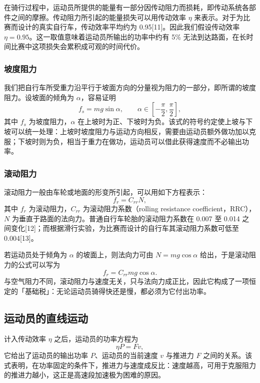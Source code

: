 \documentclass[11pt,a4paper]{ctexart}
\begin{document}
在骑行过程中，运动员所提供的能量有一部分因传动阻力而损耗，即传动系统各部件之间的摩擦。传动阻力所引起的能量损失可以用传动效率 $\eta$ 来表示。对于为比赛而设计的真实自行车，传动效率平均约为 0.95[11]。因此我们假设传动效率 $\eta=0.95$。这一取值意味着运动员所输出的功率中约有 5\% 无法到达路面，在长时间比赛中这项损失会累积成可观的时间代价。

\subsubsection{坡度阻力}

我们把自行车所受重力沿平行于坡面方向的分量视为阻力的一部分，即所谓的坡度阻力。设坡面的倾角为 $\alpha$，容易证明
\begin{equation}
f_s=mg\sin\alpha,\qquad \alpha\in\left[-\frac{\pi}{2},\frac{\pi}{2}\right],
\end{equation}
其中 $f_s$ 为坡度阻力，$\alpha$ 在上坡时为正、下坡时为负。该式的符号约定使上坡与下坡可以统一处理：上坡时坡度阻力与运动方向相反，需要由运动员额外做功加以克服；下坡时则为负，相当于重力在做功，运动员可以借此获得速度而不必输出功率。

\subsubsection{滚动阻力}

滚动阻力一般由车轮或地面的形变所引起，可以用如下方程表示：
\begin{equation}
f_r=C_{rr}N,
\end{equation}
其中 $f_r$ 为滚动阻力，$C_{rr}$ 为滚动阻力系数（rolling resistance coefficient，RRC），$N$ 为垂直于路面的法向力。普通自行车轮胎的滚动阻力系数在 0.007 至 0.014 之间变化[12]；而根据滑行实验，为比赛而设计的自行车其滚动阻力系数可低至 0.004[13]。

若运动员处于倾角为 $\alpha$ 的坡面上，则法向力可由 $N=mg\cos\alpha$ 给出，于是滚动阻力的公式可以写为
\begin{equation}
f_r=C_{rr}mg\cos\alpha.
\end{equation}
与空气阻力不同，滚动阻力与速度无关，只与法向力成正比，因此它构成了一项恒定的「基础税」：无论运动员骑得快还是慢，都必须为它付出功率。

\subsection{运动员的直线运动}

计入传动效率 $\eta$ 之后，运动员的功率方程为
\begin{equation}
\eta P=Fv,
\end{equation}
它给出了运动员的输出功率 $P$、运动员的当前速度 $v$ 与推进力 $F$ 之间的关系。该式表明，在功率固定的条件下，推进力与速度成反比：速度越高，可用于克服阻力的推进力越小，这正是高速段加速极为困难的原因。
\end{document}
